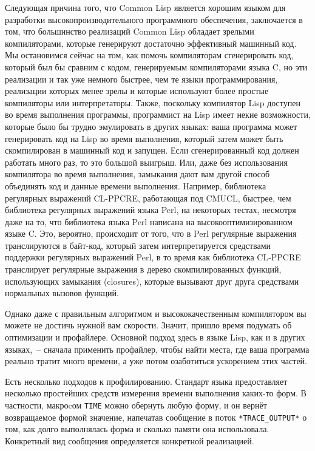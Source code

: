 Следующая причина того, что Common Lisp является хорошим языком для разработки
высокопроизводительного программного обеспечения, заключается в том, что большинство
реализаций Common Lisp обладает зрелыми компиляторами, которые генерируют достаточно
эффективный машинный код. Мы остановимся сейчас на том, как помочь компиляторам
сгенерировать код, который был бы сравним с кодом, генерируемым компиляторами языка C, но
эти реализации и так уже немного быстрее, чем те языки программирования, реализации
которых менее зрелы и которые используют более простые компиляторы или
интерпретаторы. Также, поскольку компилятор Lisp доступен во время выполнения программы,
программист на Lisp имеет некие возможности, которые было бы трудно эмулировать в других
языках: ваша программа может генерировать код на Lisp во время выполнения, который затем
может быть скомпилирован в машинный код и запущен. Если сгенерированный код должен
работать много раз, то это большой выигрыш. Или, даже без использования компилятора во
время выполнения, замыкания дают вам другой способ объединять код и данные времени
выполнения. Например, библиотека регулярных выражений CL-PPCRE, работающая под CMUCL,
быстрее, чем библиотека регулярных выражений языка Perl, на некоторых тестах, несмотря
даже на то, что библиотека языка Perl написана на высокооптимизированном языке C. Это,
вероятно, происходит от того, что в Perl регулярные выражения транслируются в байт-код,
который затем интерпретируется средствами поддержки регулярных выражений Perl, в то время
как библиотека CL-PPCRE транслирует регулярные выражения в дерево скомпилированных
функций, использующих замыкания (closures), которые вызывают друг друга средствами
нормальных вызовов функций.

Однако даже с правильным алгоритмом и высококачественным компилятором вы можете не
достичь нужной вам скорости. Значит, пришло время подумать об оптимизации и
профайлере. Основной подход здесь в языке Lisp, как и в других языках,~-- сначала
применить профайлер, чтобы найти места, где ваша программа реально тратит много времени, а
уже потом озаботиться ускорением этих частей.

Есть несколько подходов к профилированию. Стандарт языка предоставляет несколько
простейших средств измерения времени выполнения каких-то форм. В частности, макроcом
\lstinline{TIME} можно обернуть любую форму, и он вернёт возвращаемое формой значение,
напечатав сообщение в поток \lstinline!*TRACE_OUTPUT*! о том, как долго выполнялась форма
и сколько памяти она использовала. Конкретный вид сообщения определяется конкретной
реализацией.

